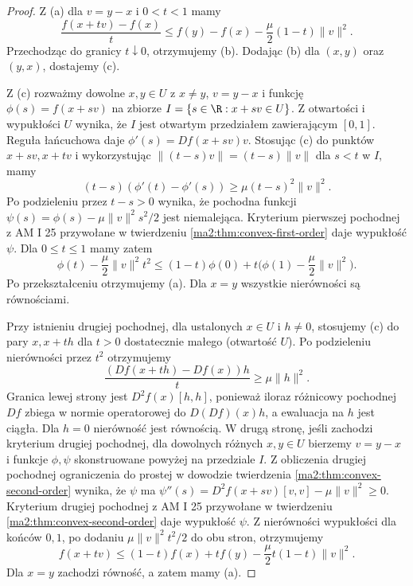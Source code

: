 \begin{proof}
Z (a) dla $v=y-x$ i $0<t<1$ mamy
\[
 \frac{f(x+tv)-f(x)}t
 \le f(y)-f(x)-\frac{\mu}{2}(1-t)\|v\|^2.
\]
Przechodząc do granicy $t\downarrow0$, otrzymujemy (b).
Dodając (b) dla $(x,y)$ oraz $(y,x)$, dostajemy (c).

Z (c) rozważmy dowolne $x,y\in U$ z $x\ne y$,
$v=y-x$ i funkcję $\phi(s)=f(x+sv)$ na zbiorze
$I=\{s\in\R:x+sv\in U\}$.
Z otwartości i wypukłości $U$ wynika, że $I$ jest
otwartym przedziałem zawierającym $[0,1]$.
Reguła łańcuchowa daje $\phi'(s)=Df(x+sv)v$.
Stosując (c) do punktów $x+sv,x+tv$ i wykorzystując
$\|(t-s)v\|=(t-s)\|v\|$ dla $s<t$ w $I$, mamy
\[
 (t-s)(\phi'(t)-\phi'(s))\ge
          \mu(t-s)^2\|v\|^2.
\]
Po podzieleniu przez $t-s>0$ wynika, że pochodna
funkcji $\psi(s)=\phi(s)-\mu\|v\|^2s^2/2$
jest niemalejąca. Kryterium pierwszej pochodnej
z AM I 25 przywołane w twierdzeniu
\ref{ma2:thm:convex-first-order} daje wypukłość $\psi$.
Dla $0\le t\le1$ mamy zatem
\[
 \phi(t)-\frac{\mu}{2}\|v\|^2t^2
 \le (1-t)\phi(0)+t\bigl(\phi(1)-\frac{\mu}{2}\|v\|^2\bigr).
\]
Po przekształceniu otrzymujemy (a).
Dla $x=y$ wszystkie nierówności są równościami.

Przy istnieniu drugiej pochodnej, dla ustalonych
$x\in U$ i $h\ne0$, stosujemy (c) do pary $x,x+th$
dla $t>0$ dostatecznie małego (otwartość $U$).
Po podzieleniu nierówności przez $t^2$ otrzymujemy
\[
 \frac{(Df(x+th)-Df(x))h}{t}\ge\mu\|h\|^2.
\]
Granica lewej strony jest $D^2f(x)[h,h]$, ponieważ
iloraz różnicowy pochodnej $Df$ zbiega w normie
operatorowej do $D(Df)(x)h$, a ewaluacja na $h$
jest ciągła. Dla $h=0$ nierówność jest równością.
W drugą stronę, jeśli zachodzi kryterium drugiej
pochodnej, dla dowolnych różnych $x,y\in U$ bierzemy
$v=y-x$ i funkcje $\phi,\psi$ skonstruowane powyżej
na przedziale $I$. Z obliczenia drugiej pochodnej
ograniczenia do prostej w dowodzie twierdzenia
\ref{ma2:thm:convex-second-order} wynika, że $\psi$ ma $\psi''(s)=D^2f(x+sv)[v,v]-\mu\|v\|^2\ge0$.
Kryterium drugiej pochodnej z AM I 25
przywołane w twierdzeniu \ref{ma2:thm:convex-second-order}
daje wypukłość $\psi$. Z nierówności wypukłości
dla końców $0,1$, po dodaniu
$\mu\|v\|^2t^2/2$ do obu stron, otrzymujemy
\[
 f(x+tv)\le(1-t)f(x)+tf(y)
              -\frac{\mu}{2}t(1-t)\|v\|^2.
\]
Dla $x=y$ zachodzi równość, a zatem mamy (a).
\end{proof}

